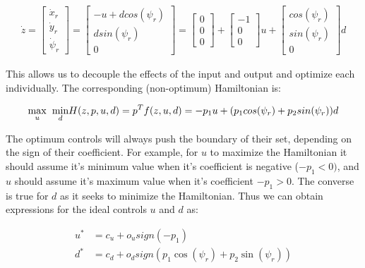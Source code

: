 \documentclass[a4paper]{article}
\begin{document}
\begin{align*}
  \dot{z}
  =
  \left[\begin{matrix} \dot{x}_r \\ \dot{y}_r \\ \dot{\psi}_r \end{matrix}\right]
  =
  \left[\begin{matrix} -u + d cos(\psi_r) \\ d sin(\psi_r) \\ 0 \end{matrix}\right]
  =
  \left[ \begin{matrix} 0 \\ 0 \\ 0 \end{matrix}\right] + \left[ \begin{matrix}-1 \\ 0 \\ 0\end{matrix}\right] u +\left[\begin{matrix} cos(\psi_r) \\ sin(\psi_r) \\ 0 \end{matrix}\right] d
\end{align*}

This allows us to decouple the effects of the input and output and optimize each individually.
   The corresponding (non-optimum) Hamiltonian is:

\begin{align*}
  \underset{u}{\max} \hspace{2 mm} \underset{d}{\min} H(z,p,u,d) =  p^T f(z,u,d) = -p_1 u + (p_1 cos(\psi_r) + p_2 sin(\psi_r)) d
\end{align*}

The optimum controls will always push the boundary of their set, depending on the sign of their coefficient.
For example, for $u$ to maximize the Hamiltonian it should assume it's minimum value when it's coefficient is negative ($-p_1 < 0)$, and $u$ should assume it's maximum value when it's coefficient $-p_1 > 0$.
The converse is true for $d$ as it seeks to minimize the Hamiltonian.
Thus we can obtain expressions for the ideal controls $u$ and $d$ as:

\begin{align*}
  u^* &= c_u + o_u sign(-p_1) \\
  d^* &= c_d + o_d sign(p_1 \cos(\psi_r) + p_2 \sin(\psi_r))
\end{align*}
\end{document}
